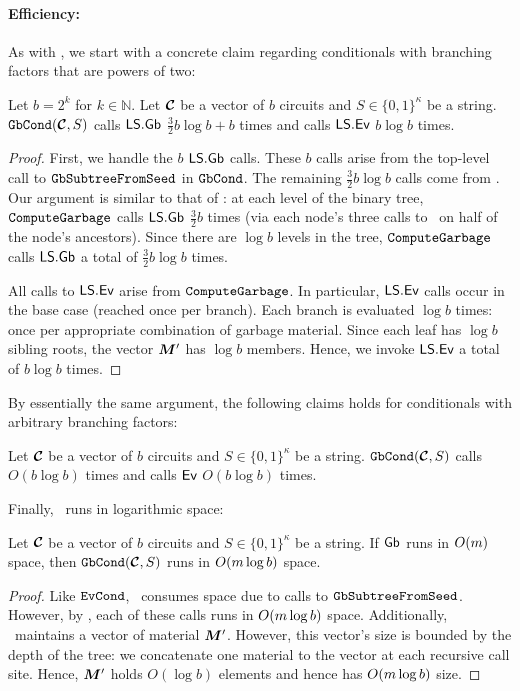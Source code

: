 \paragraph{Efficiency:} As with \evcond, we start with a concrete claim
regarding conditionals with branching factors that are powers of two:
\begin{lemma}\label{lemma:gbcondtime}
  Let $b = 2^k$ for $k \in \mathbb{N}$.
  Let $\vec{\cir}$ be a vector of $b$ circuits and $S \in \{0,
  1\}^\kappa$ be a string.
  $\gbcond(\vec{\cir}, S)$ calls $\textsf{LS}.\textsf{Gb}$ $\frac{3}{2}b \log b + b$ times and calls
  $\textsf{LS}.\textsf{Ev}$ $b\log b$ times.
\end{lemma}
\begin{proof}
  First, we handle the $b$ $\textsf{LS}.\textsf{Gb}$ calls. These $b$ calls arise from the
  top-level call to $\mathtt{GbSubtreeFromSeed}$ in $\mathtt{GbCond}$.
  The remaining $\frac{3}{2} b \log b$ calls come from
  \computegarbage.
  Our argument is similar to that of :
  at each level of the binary tree, $\mathtt{ComputeGarbage}$ calls
  $\textsf{LS}.\textsf{Gb}$ $\frac{3}{2}b$ times (via each node's three calls to \gbtree\
  on half of the node's ancestors).
  Since there are $\log b$ levels in the tree, $\mathtt{ComputeGarbage}$ calls
  $\textsf{LS}.\textsf{Gb}$ a total of $\frac{3}{2}b \log b$ times.

  All calls to $\textsf{LS}.\textsf{Ev}$ arise from $\mathtt{ComputeGarbage}$.
  In particular, $\textsf{LS}.\textsf{Ev}$ calls occur in the base case (reached once per
  branch).
  Each branch is evaluated $\log b$ times: once per appropriate
  combination of garbage material. Since each leaf has $\log b$
  sibling roots, the vector $\vec{\mat}'$ has $\log b$ members.
  Hence, we invoke $\textsf{LS}.\textsf{Ev}$ a total of $b \log b$ times.
\end{proof}

By essentially the same argument, the following claims holds
for conditionals with arbitrary branching factors:
\begin{lemma}\label{lemma:gbcondtime-general}
  Let $\vec{\cir}$ be a vector of $b$ circuits and $S \in \{0,
  1\}^\kappa$ be a string.
  $\gbcond(\vec{\cir}, S)$ calls \gGb\ $O(b \log b)$ times and calls
  $\textsf{Ev}$ $O(b\log b)$ times.
\end{lemma}

Finally, \gbcond\ runs in logarithmic space:
\begin{lemma}\label{lemma:gbcondspace}
  Let $\vec{\cir}$ be a vector of $b$ circuits and $S \in \{0, 1\}^\kappa$ be a string.
  If $\textsf{Gb}$ runs in $O(m)$ space, then
  $\gbcond(\vec{\cir}, S)$ runs in $O(m \log b)$ space.
\end{lemma}
\begin{proof}
  Like $\mathtt{EvCond}$, \gbcond\ consumes space due to calls to
  $\mathtt{GbSubtreeFromSeed}$. However, by , each of these calls
  runs in $O(m \log b)$ space.
  Additionally, \computegarbage\ maintains a vector of material
  $\vec{\mat}'$.
  However, this vector's size is bounded by the depth of the tree: we
  concatenate one material to the vector at each recursive call
  site.
  Hence, $\vec{\mat}'$ holds $O(\log b)$ elements and hence has
  $O(m \log b)$ size.
\end{proof}
